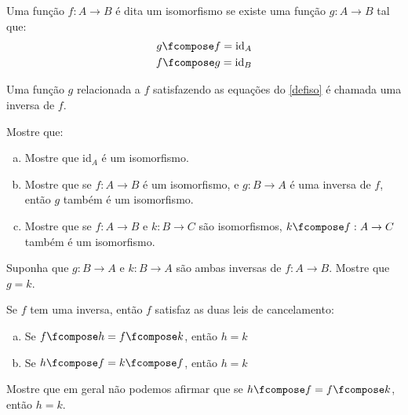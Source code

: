 \begin{definition}[Isomorfismo]
\label{defiso}
    Uma função $f : A \to B$ é dita um isomorfismo se existe uma função $g : A \to B$ tal que:
    $$
        \begin{aligned}
            g \fcompose f = \text{id}_A\\
            f \fcompose g = \text{id}_B
        \end{aligned}
    $$
\end{definition}

\begin{definition}[Inversa]
    Uma função $g$ relacionada a $f$ satisfazendo as equações do \ref{defiso} é chamada uma inversa de $f$.
\end{definition}

\begin{exercise}
    Mostre que:
    \begin{enumerate}[(a)]
        \item Mostre que id$_A$ é um isomorfismo.
        \item Mostre que se $f : A \to B$ é um isomorfismo, e $g : B \to A$ é uma inversa de $f$, então $g$ também é um isomorfismo.
        \item Mostre que se $f : A \to B$ e $k : B \to C$ são isomorfismos, $k \fcompose f : A \to C$ também é um isomorfismo.
    \end{enumerate}
\end{exercise}

\begin{exercise}
    Suponha que $g : B \to A$ e $k : B \to A$ são ambas inversas de $f : A \to B$. Mostre que $g = k$.
\end{exercise}

\begin{exercise}
    Se $f$ tem uma inversa, então $f$ satisfaz as duas leis de cancelamento:
    \begin{enumerate}[(a)]
        \item Se $f \fcompose h = f \fcompose k$, então $h = k$
        \item Se $h \fcompose f = k \fcompose f$, então $h = k$
    \end{enumerate}
\end{exercise}

\begin{exercise}
    Mostre que em geral não podemos afirmar que se $h \fcompose f = f \fcompose k$, então $h = k$.
\end{exercise}
